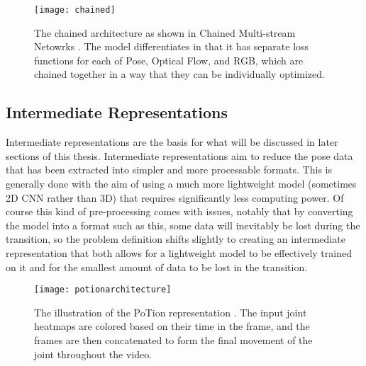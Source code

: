 \begin{figure}[ht]
	\texttt{[image: chained]}
	\centering
	\caption{The chained architecture as shown in Chained Multi-stream Netowrks \cite{Chained}. The model differentiates in that it has separate loss functions for each of Pose, Optical Flow, and RGB, which are chained together in a way that they can be individually optimized.}
	\label{fig:chained}
\end{figure}

\subsection{Intermediate Representations}
\label{sec:intermediate}

Intermediate representations are the basis for what will be discussed in later sections of this thesis. Intermediate representations aim to reduce the pose data that has been extracted into simpler and more processable formats. This is generally done with the aim of using a much more lightweight model (sometimes 2D CNN rather than 3D) that requires significantly less computing power. Of course this kind of pre-processing comes with issues, notably that by converting the model into a format such as this, some data will inevitably be lost during the transition, so the problem definition shifts slightly to creating an intermediate representation that both allows for a lightweight model to be effectively trained on it and for the smallest amount of data to be lost in the transition.

\begin{figure}[ht]
	\texttt{[image: potionarchitecture]}
	\centering
	\caption{The illustration of the PoTion representation \cite{potion}. The input joint heatmaps are colored based on their time in the frame, and the frames are then concatenated to form the final movement of the joint throughout the video.}
	\label{fig:potion-architecture}
\end{figure}

